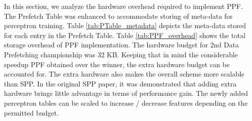 In this section, we analyze the hardware overhead required to
implement PPF. The Prefetch Table was enhanced to accommodate
storing of meta-data for perceptron training. Table
\ref{tab:PTable_metadata} depicts the meta-data stored for each entry in
the Prefetch Table. Table \ref{tab:PPF_overhead} shows the total
storage overhead of PPF implementation. The hardware budget for
2nd Data Prefetching championship was 32 KB. Keeping that in mind 
the considerable speedup PPF obtained over the winner, the extra hardware
budget can be accounted for. The extra hardware also makes the
overall scheme more scalable than SPP. In the original SPP paper, it
was demonstrated that adding extra hardware brings little advantage in
terms of performance gain. The newly added perceptron tables can be
scaled to increase / decrease features depending on the permitted
budget.


